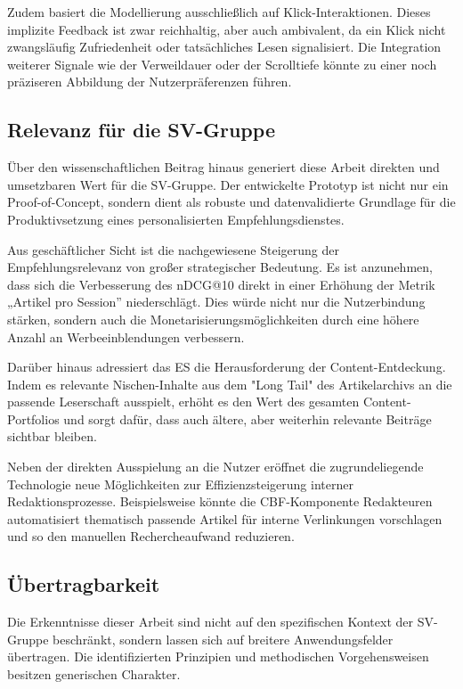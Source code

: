 Zudem basiert die Modellierung ausschließlich auf Klick-Interaktionen. Dieses implizite Feedback ist zwar 
reichhaltig, aber auch ambivalent, da ein Klick nicht zwangsläufig Zufriedenheit oder tatsächliches Lesen signalisiert. 
Die Integration weiterer Signale wie der Verweildauer oder der Scrolltiefe könnte zu einer noch präziseren 
Abbildung der Nutzerpräferenzen führen.

\subsection{Relevanz für die SV-Gruppe}
Über den wissenschaftlichen Beitrag hinaus generiert diese Arbeit direkten und umsetzbaren Wert für die
 \ac{SV-Gruppe}. Der entwickelte Prototyp ist nicht nur ein Proof-of-Concept, sondern dient als robuste 
 und datenvalidierte Grundlage für die Produktivsetzung eines personalisierten Empfehlungsdienstes.

Aus geschäftlicher Sicht ist die nachgewiesene Steigerung der Empfehlungsrelevanz von großer strategischer
Bedeutung. Es ist anzunehmen, dass sich die Verbesserung des \ac{nDCG}@10 direkt in einer Erhöhung der Metrik 
„Artikel pro Session” niederschlägt. Dies würde nicht nur die Nutzerbindung stärken, 
sondern auch die Monetarisierungsmöglichkeiten durch eine höhere Anzahl an Werbeeinblendungen verbessern.

Darüber hinaus adressiert das \ac{ES} die Herausforderung der Content-Entdeckung. Indem es relevante 
Nischen-Inhalte aus dem "Long Tail" des Artikelarchivs an die passende Leserschaft ausspielt, erhöht es 
den Wert des gesamten Content-Portfolios und sorgt dafür, dass auch ältere, aber weiterhin relevante Beiträge 
sichtbar bleiben.

Neben der direkten Ausspielung an die Nutzer eröffnet die zugrundeliegende Technologie neue Möglichkeiten zur 
Effizienzsteigerung interner Redaktionsprozesse. Beispielsweise könnte die \ac{CBF}-Komponente Redakteuren 
automatisiert thematisch passende Artikel für interne Verlinkungen vorschlagen und so den manuellen 
Rechercheaufwand reduzieren.

\subsection{Übertragbarkeit}
Die Erkenntnisse dieser Arbeit sind nicht auf den spezifischen Kontext der \ac{SV-Gruppe} beschränkt, 
sondern lassen sich auf breitere Anwendungsfelder übertragen. Die identifizierten Prinzipien und methodischen 
Vorgehensweisen besitzen generischen Charakter.


